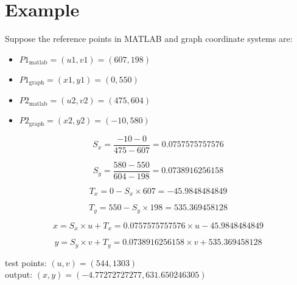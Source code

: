 \documentclass[a4paper,12pt]{article}
\begin{document}
\section*{Example}

Suppose the reference points in MATLAB and graph coordinate systems are:

\begin{itemize}
    \item $P1_{\text{matlab}} = (u1, v1) = (607, 198)$
    \item $P1_{\text{graph}} = (x1, y1) = (0, 550)$
    \item $P2_{\text{matlab}} = (u2, v2) = (475, 604)$
    \item $P2_{\text{graph}} = (x2, y2) = (-10, 580)$
\end{itemize}

\begin{equation}
S_x = \frac{-10 - 0}{475 - 607} = 0.0757575757576
\end{equation}

\begin{equation}
S_y = \frac{580-550}{604 - 198} = 0.0738916256158
\end{equation}

\begin{equation}
T_x = 0 - S_x \times 607 = -45.9848484849
\end{equation}

\begin{equation}
T_y = 550 - S_y \times 198 = 535.369458128
\end{equation}

\begin{equation}
x = S_x \times u + T_x = 0.0757575757576 \times u -45.9848484849
\end{equation}

\begin{equation}
y = S_y \times v + T_y = 0.0738916256158 \times v + 535.369458128
\end{equation}

\vspace{5pt}
\begin{center}
\noindent test points: $(u, v) = (544, 1303)$ \\
output: $(x,y) = (-4.77272727277, 631.650246305)$
\end{center}
\end{document}
